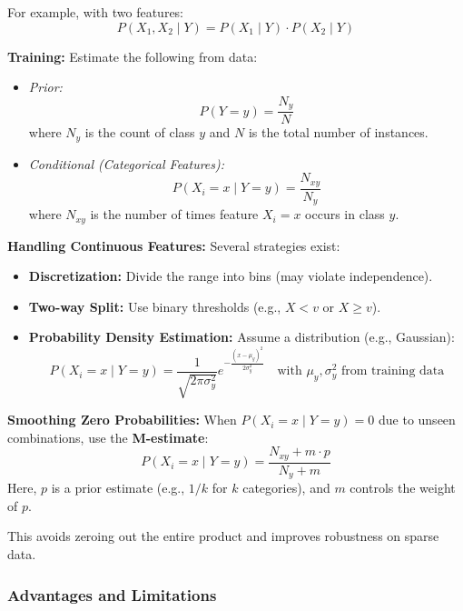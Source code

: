 For example, with two features:
\begin{equation}
P(X_1, X_2 \mid Y) = P(X_1 \mid Y) \cdot P(X_2 \mid Y)
\end{equation}

\textbf{Training:} Estimate the following from data:
\begin{itemize}
    \item \textit{Prior:}
    \begin{equation}
    P(Y = y) = \frac{N_y}{N}
    \end{equation}
    where $N_y$ is the count of class $y$ and $N$ is the total number of instances.

    \item \textit{Conditional (Categorical Features):}
    \begin{equation}
    P(X_i = x \mid Y = y) = \frac{N_{xy}}{N_y}
    \end{equation}
    where $N_{xy}$ is the number of times feature $X_i = x$ occurs in class $y$.
\end{itemize}

\textbf{Handling Continuous Features:}  
Several strategies exist:
\begin{itemize}
    \item \textbf{Discretization:} Divide the range into bins (may violate independence).
    \item \textbf{Two-way Split:} Use binary thresholds (e.g., $X < v$ or $X \geq v$).
    \item \textbf{Probability Density Estimation:} Assume a distribution (e.g., Gaussian):
    \begin{equation}
    P(X_i = x \mid Y = y) = \frac{1}{\sqrt{2\pi\sigma^2_y}} e^{-\frac{(x - \mu_y)^2}{2\sigma^2_y}} \quad \text{with } \mu_y, \sigma^2_y \text{ from training data}
    \end{equation}
\end{itemize}

\textbf{Smoothing Zero Probabilities:}  
When $P(X_i = x \mid Y = y) = 0$ due to unseen combinations, use the \textbf{M-estimate}:
\begin{equation}
P(X_i = x \mid Y = y) = \frac{N_{xy} + m \cdot p}{N_y + m}
\end{equation}
Here, $p$ is a prior estimate (e.g., $1/k$ for $k$ categories), and $m$ controls the weight of $p$.

This avoids zeroing out the entire product and improves robustness on sparse data.

\subsubsection{Advantages and Limitations}

